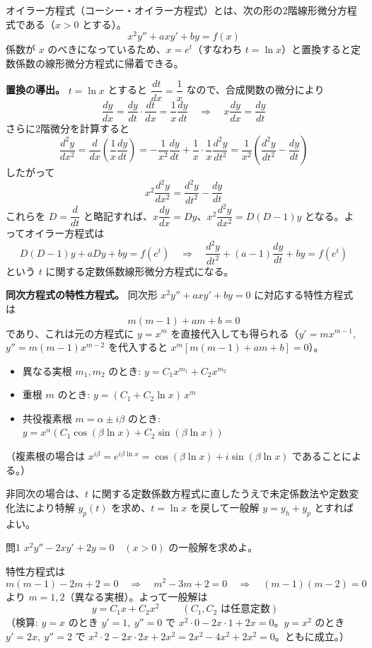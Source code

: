 \documentclass[a4paper,11pt]{article}
\begin{document}


\noindent
オイラー方程式（コーシー・オイラー方程式）とは、次の形の2階線形微分方程式である（$x>0$ とする）。
\[
x^{2}y'' + axy' + by = f(x)
\]
係数が $x$ のべきになっているため、$x = e^{t}$（すなわち $t = \ln x$）と置換すると定数係数の線形微分方程式に帰着できる。

\medskip
\noindent
\textbf{置換の導出。}
$t = \ln x$ とすると $\dfrac{dt}{dx} = \dfrac{1}{x}$ なので、合成関数の微分により
\[
\frac{dy}{dx} = \frac{dy}{dt}\cdot\frac{dt}{dx} = \frac{1}{x}\frac{dy}{dt}
\quad\Longrightarrow\quad
x\frac{dy}{dx} = \frac{dy}{dt}
\]
さらに2階微分を計算すると
\[
\frac{d^{2}y}{dx^{2}}
= \frac{d}{dx}\!\left(\frac{1}{x}\frac{dy}{dt}\right)
= -\frac{1}{x^{2}}\frac{dy}{dt} + \frac{1}{x}\cdot\frac{1}{x}\frac{d^{2}y}{dt^{2}}
= \frac{1}{x^{2}}\left(\frac{d^{2}y}{dt^{2}} - \frac{dy}{dt}\right)
\]
したがって
\[
x^{2}\frac{d^{2}y}{dx^{2}} = \frac{d^{2}y}{dt^{2}} - \frac{dy}{dt}
\]
これらを $D = \dfrac{d}{dt}$ と略記すれば、$x\dfrac{dy}{dx} = Dy$、$x^{2}\dfrac{d^{2}y}{dx^{2}} = D(D-1)y$ となる。よってオイラー方程式は
\[
D(D-1)y + aDy + by = f(e^{t})
\quad\Longrightarrow\quad
\frac{d^{2}y}{dt^{2}} + (a-1)\frac{dy}{dt} + by = f(e^{t})
\]
という $t$ に関する定数係数線形微分方程式になる。

\medskip
\noindent
\textbf{同次方程式の特性方程式。}
同次形 $x^{2}y''+axy'+by=0$ に対応する特性方程式は
\[
m(m-1) + am + b = 0
\]
であり、これは元の方程式に $y = x^{m}$ を直接代入しても得られる（$y'=mx^{m-1}$, $y''=m(m-1)x^{m-2}$ を代入すると $x^{m}\left[m(m-1)+am+b\right]=0$）。
\begin{itemize}
\item 異なる実根 $m_{1}, m_{2}$ のとき: $y = C_{1}x^{m_{1}} + C_{2}x^{m_{2}}$
\item 重根 $m$ のとき: $y = (C_{1} + C_{2}\ln x)\,x^{m}$
\item 共役複素根 $m = \alpha \pm i\beta$ のとき: $y = x^{\alpha}\left(C_{1}\cos(\beta\ln x) + C_{2}\sin(\beta\ln x)\right)$
\end{itemize}
（複素根の場合は $x^{i\beta} = e^{i\beta\ln x} = \cos(\beta\ln x) + i\sin(\beta\ln x)$ であることによる。）

非同次の場合は、$t$ に関する定数係数方程式に直したうえで未定係数法や定数変化法により特解 $y_{p}(t)$ を求め、$t=\ln x$ を戻して一般解 $y = y_{h} + y_{p}$ とすればよい。

\clearpage
\begin{mondaiboxS}{問1}
$x^{2}y'' - 2xy' + 2y = 0 \quad (x>0)$ の一般解を求めよ。
\end{mondaiboxS}
\kaitou
特性方程式は
\[
m(m-1) - 2m + 2 = 0
\quad\Longrightarrow\quad
m^{2} - 3m + 2 = 0
\quad\Longrightarrow\quad
(m-1)(m-2) = 0
\]
より $m = 1, 2$（異なる実根）。よって一般解は
\[
\boxed{\; y = C_{1}x + C_{2}x^{2} \;}
\qquad (C_{1}, C_{2} \text{ は任意定数})
\]
（検算: $y=x$ のとき $y'=1,\ y''=0$ で $x^{2}\cdot 0 - 2x\cdot 1 + 2x = 0$。$y=x^{2}$ のとき $y'=2x,\ y''=2$ で $x^{2}\cdot 2 - 2x\cdot 2x + 2x^{2} = 2x^{2}-4x^{2}+2x^{2}=0$。ともに成立。）
\end{document}
